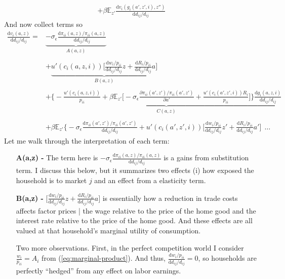 \documentclass[12pt,pdftex]{article}
\begin{document}
\begin{onehalfspacing}
{\begin{align}
+ \beta \mathbb{E}_{z'} \frac{\mathrm{d} v_i(g_{i}(a',z',i), z'')}{\mathrm{d} d_{ij} / d_{ij}}
\end{align}
}
And now collect terms so
{\small
\begin{align}
\frac{\mathrm{d} v_i(a, z)}{\mathrm{d} d_{ij} / d_{ij}} =& \underbrace{-\sigma_{\epsilon} \frac{\mathrm{d} \pi_{ii}(a,z) / \pi_{ii}(a,z)}{\mathrm{d}d_{ij} / d_{ij}}}_{A(a,z)} \\
\nonumber \\
& + \underbrace{u'(c_{i}(a,z,i)) \bigg[ \frac{\mathrm{d} w_{i} / p_{ii}}{\mathrm{d} d_{ij} / d_{ij}}z  +  \frac{\mathrm{d} R_{i} / p_{ii}}{\mathrm{d} d_{ij} / d_{ij}} a  \bigg]}_{B(a,z)}  \\
\nonumber \\
& + \underbrace{\bigg \{- \frac{u'(c_{i}(a,z,i))}{p_{ii}} + \beta \mathbb{E}_{z'} \bigg [-\sigma_{\epsilon} \frac{\partial \pi_{ii}(a',z') / \pi_{ii}(a',z')}{\partial a'} + \frac{u'(c_{i}(a',z',i))R_{i}}{p_{ii}} \bigg ] \bigg \}\frac{\mathrm{d} g_{i}(a,z,i)}{\mathrm{d} d_{ij} / d_{ij}}}_{C(a,z)} \\
\nonumber \\
& + \beta \mathbb{E}_{z'} \bigg \{ -\sigma_{\epsilon} \frac{\mathrm{d} \pi_{ii}(a',z') / \pi_{ii}(a',z')}{\mathrm{d}d_{ij} / d_{ij}} +  u'(c_{i}(a',z',i)) \bigg[ \frac{\mathrm{d} w_{i} / p_{ii}}{\mathrm{d} d_{ij} / d_{ij}}z'  +  \frac{\mathrm{d} R_{i} / p_{ii}}{\mathrm{d} d_{ij} / d_{ij}} a' \bigg] \ \  \ldots
\label{eq:apx-welfare-vterms}
\end{align}
}
Let me walk through the interpretation of each term:
\begin{itemize}
\item[\textbf{A(a,z) -}] The term here is $-\sigma_{\epsilon} \frac{\mathrm{d} \pi_{ii}(a,z) / \pi_{ii}(a,z)}{\mathrm{d}d_{ij} / d_{ij}}$ is a gains from substitution term. I discuss this below, but it summarizes two effects (i) how exposed the household is to market $j$ and an effect from a elasticity term.

\item[\textbf{B(a,z) -}] $\bigg[ \frac{\mathrm{d} w_{i} / p_{ii}}{\mathrm{d} d_{ij} / d_{ij}}z  +  \frac{\mathrm{d} R_{i} / p_{ii}}{\mathrm{d} d_{ij} / d_{ij}} a  \bigg]$ is essentially how a reduction in trade costs affects factor prices | the wage relative to the price of the home good and the interest rate relative to the price of the home good. And these effects are all valued at that household's marginal utility of consumption.

    Two more observations. First, in the perfect competition world I consider $\frac{w_i}{p_{ii}} = A_{i}$ from (\ref{eq:marginal-product}). And thus, $\frac{\mathrm{d} w_{i} / p_{ii}}{\mathrm{d} d_{ij} / d_{ij}} = 0$, so households are perfectly ``hedged'' from any effect on labor earnings.


\end{itemize}
\end{onehalfspacing}
\end{document}
